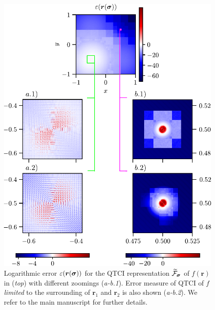 \begin{figure}[ht!]
	\centering
	\includegraphics{figures/Error_heatmap_localFunc.pdf}
	\caption{Logarithmic error $\varepsilon(\boldsymbol{r}(\boldsymbol{\sigma}))$ for the QTCI representation $\widetilde{\mathcal{F}}_{\boldsymbol{\sigma}}$ of $f(\boldsymbol{r})$ in  (\textit{top}) with different zoomings (\textit{a-b.1}). Error measure of QTCI of $f$ \textit{limited} to the surrounding of $\boldsymbol{r}_1$ and $\boldsymbol{r}_2$ is also shown (\textit{a-b.2}). We refer to the main manuscript for further details. }
	\label{fig:errorLocalFunc}
\end{figure}

